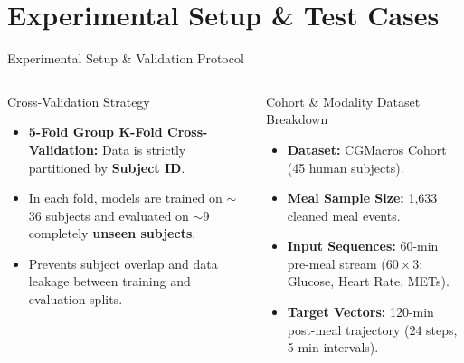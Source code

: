 \documentclass[10pt,aspectratio=169]{beamer}
\begin{document}
\section{Experimental Setup \& Test Cases}

\begin{frame}{Experimental Setup \& Validation Protocol}
    \begin{columns}
        \begin{block}{Cross-Validation Strategy}
            \begin{itemize}
                \justifying
                \item \textbf{5-Fold Group K-Fold Cross-Validation:} Data is strictly partitioned by \textbf{Subject ID}.
                \item In each fold, models are trained on $\sim$36 subjects and evaluated on $\sim$9 completely \textbf{unseen subjects}.
                \item Prevents subject overlap and data leakage between training and evaluation splits.
            \end{itemize}
        \end{block}
        
        \vspace{0.1cm}
        \begin{block}{Cohort & Modality Dataset Breakdown}
            \begin{itemize}
                \justifying
                \item \textbf{Dataset:} CGMacros Cohort (45 human subjects).
                \item \textbf{Meal Sample Size:} 1,633 cleaned meal events.
                \item \textbf{Input Sequences:} 60-min pre-meal stream ($60 \times 3$: Glucose, Heart Rate, METs).
                \item \textbf{Target Vectors:} 120-min post-meal trajectory ($24$ steps, 5-min intervals).
            \end{itemize}
        \end{block}


\end{columns}
\end{frame}
\end{document}

